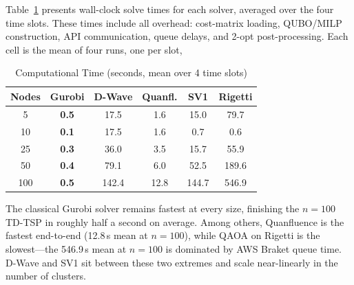 \documentclass[conference]{IEEEtran}
\begin{document}
Table~\ref{tab:results_time} presents wall-clock solve times for each solver, averaged over the four time slots. These times include all overhead: cost-matrix loading, QUBO/MILP construction, API communication, queue delays, and 2-opt post-processing. Each cell is the mean of four runs, one per slot, 

\begin{table}[htbp]
\caption{Computational Time (seconds, mean over 4 time slots)}
\begin{center}
\begin{tabular}{|c|c|c|c|c|c|}
\hline
\textbf{Nodes} & \textbf{Gurobi} & \textbf{D-Wave} & \textbf{Quanfl.} & \textbf{SV1} & \textbf{Rigetti} \\
\hline
5   & \textbf{0.5} & 17.5  & 1.6  & 15.0  & 79.7  \\
\hline
10  & \textbf{0.1} & 17.5  & 1.6  & 0.7   & 0.6   \\
\hline
25  & \textbf{0.3} & 36.0  & 3.5  & 15.7  & 55.9  \\
\hline
50  & \textbf{0.4} & 79.1  & 6.0  & 52.5  & 189.6 \\
\hline
100 & \textbf{0.5} & 142.4 & 12.8 & 144.7 & 546.9 \\
\hline
\end{tabular}
\label{tab:results_time}
\end{center}
\end{table}

The classical Gurobi solver remains fastest at every size, finishing the $n=100$ TD-TSP in roughly half a second on average. Among others, Quanfluence is the fastest end-to-end (12.8\,s mean at $n=100$), while QAOA on Rigetti is the slowest---the 546.9\,s mean at $n=100$ is dominated by AWS Braket queue time. D-Wave and SV1 sit between these two extremes and scale near-linearly in the number of clusters.


\end{document}
